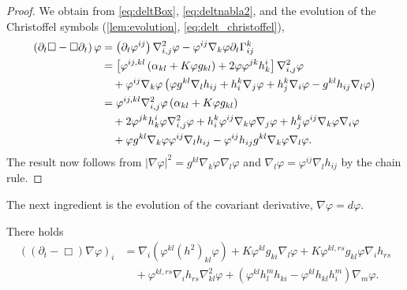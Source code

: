 \documentclass{amsart}
\begin{document}
\begin{proof}
We obtain from \cref{eq:deltBox}, \cref{eq:deltnabla2}, and the evolution of the Christoffel symbols (\cref{lem:evolution}, \cref{eq:delt_christoffel}),
\[
\begin{split}
\left(\partial_{t}\Box - \Box\partial_{t}\right) \varphi &= \left(\partial_{t}\varphi^{ij}\right) \nabla^2_{i,j} \varphi - \varphi^{ij}\nabla_k \varphi\partial_t \Gamma^{k}_{ij} \\
&= \left[\varphi^{ij,kl} \left(\alpha_{kl} + K \varphi g_{kl}\right) + 2\varphi\varphi^{jk}h^{i}_{k}\right] \nabla^2_{i,j} \varphi \\
&\quad + \varphi^{ij} \nabla_k \varphi \left(\varphi g^{kl} \nabla_l h_{ij} + h^k_i \nabla_j \varphi + h^k_j \nabla_i \varphi - g^{kl} h_{ij} \nabla_l \varphi\right) \\
&= \varphi^{ij,kl} \nabla^2_{i,j} \varphi \left(\alpha_{kl} + K \varphi g_{kl}\right) \\
&\quad + 2\varphi^{jk}h^{i}_{k}\varphi \nabla^2_{i,j} \varphi + h^k_i \varphi^{ij} \nabla_k \varphi \nabla_j \varphi + h^k_j \varphi^{ij} \nabla_k \varphi \nabla_i \varphi \\
&\quad + \varphi g^{kl}\nabla_k \varphi \varphi^{ij} \nabla_l h_{ij} - \varphi^{ij} h_{ij} g^{kl}\nabla_k \varphi \nabla_l \varphi.
\end{split}
\]
The result now follows from \(|\nabla \varphi|^2 = g^{kl}\nabla_k \varphi \nabla_l \varphi\) and \(\nabla_l \varphi = \varphi^{ij} \nabla_l h_{ij}\) by the chain rule.
\end{proof}

The next ingredient is the evolution of the covariant derivative, \(\nabla \varphi = d\varphi\).

\begin{lemma}
\label{lem:Evgradphi}
There holds
\[
\begin{split}
\left((\partial_{t}-\Box)\nabla\varphi\right)_{i} &= \nabla_i \left(\varphi^{kl} (h^2)_{kl}\varphi\right) + K\varphi^{kl}g_{ki} \nabla_l \varphi + K\varphi^{kl,rs} g_{kl}\varphi \nabla_i h_{rs}  \\
&\quad + \varphi^{kl,rs}\nabla_i h_{rs}\nabla^2_{kl} \varphi + \left(\varphi^{kl}h^{m}_{l}h_{ki} - \varphi^{kl}h_{kl}h^{m}_{i}\right) \nabla_m \varphi.
\end{split}
\]
\end{lemma}
\end{document}
